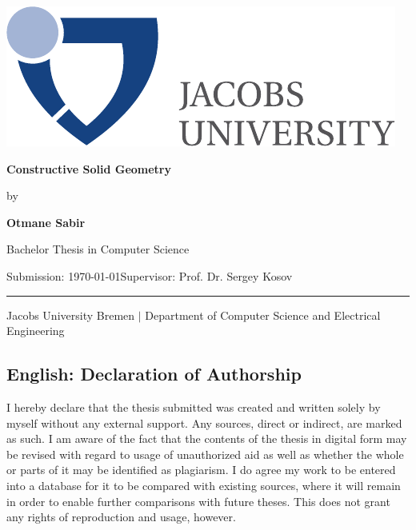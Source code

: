 \documentclass[a4paper,11pt,oneside]{article}
\newcommand{\myname}{Otmane Sabir}
\newcommand{\mytitle}{Constructive Solid Geometry}
\newcommand{\mysupervisor}{Prof. Dr. Sergey Kosov}
\begin{document}

\thispagestyle{empty}

\begin{flushright}
	\includegraphics[scale=0.8]{bsc-logo}
\end{flushright}
\vspace*{40mm}
\begin{center}
	\huge
	\textbf{\mytitle}
\end{center}
\vspace*{4mm}
\begin{center}
	\Large by
\end{center}
\vspace*{4mm}
\begin{center}
	\LARGE
	\textbf{\myname}
\end{center}
\vspace*{20mm}
\begin{center}
	\Large
	Bachelor Thesis in Computer Science
\end{center}
\vfill
\begin{flushleft}
	\large
	Submission: \today \hfill Supervisor: \mysupervisor \\
	\rule{\textwidth}{1pt}
\end{flushleft}
\begin{center}
	Jacobs University Bremen $|$ Department of Computer Science and Electrical Engineering
\end{center}

\newpage
\thispagestyle{empty}

\subsection*{English: Declaration of Authorship}
 
I hereby declare that the thesis submitted was created and written
solely by myself without any external support. Any sources, direct
or indirect, are marked as such. I am aware of the fact that the
contents of the thesis in digital form may be revised with regard to
usage of unauthorized aid as well as whether the whole or parts of
it may be identified as plagiarism. I do agree my work to be entered
into a database for it to be compared with existing sources, where
it will remain in order to enable further comparisons with future
theses. This does not grant any rights of reproduction and usage,
however.
\end{document}
